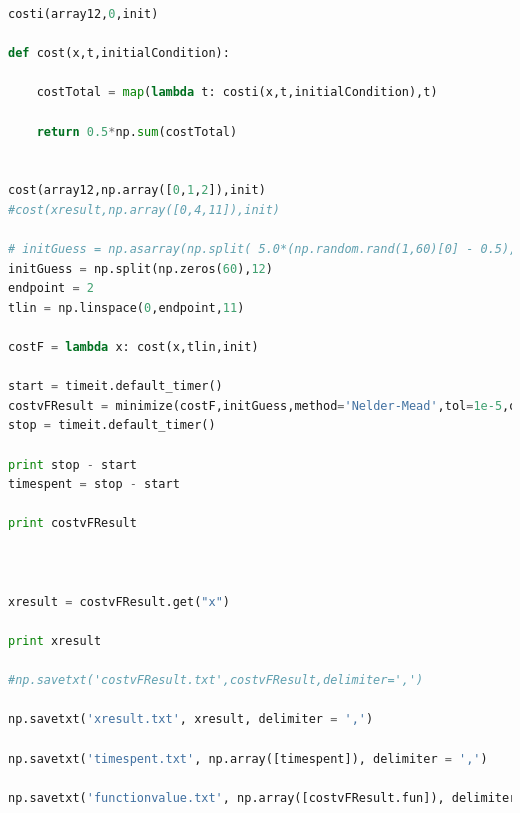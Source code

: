 \documentclass{tufte-handout}
\begin{document}
\begin{lstlisting}[language=Python]
costi(array12,0,init)

def cost(x,t,initialCondition):

    costTotal = map(lambda t: costi(x,t,initialCondition),t)

    return 0.5*np.sum(costTotal)


cost(array12,np.array([0,1,2]),init)
#cost(xresult,np.array([0,4,11]),init)

# initGuess = np.asarray(np.split( 5.0*(np.random.rand(1,60)[0] - 0.5),12))
initGuess = np.split(np.zeros(60),12)
endpoint = 2
tlin = np.linspace(0,endpoint,11)

costF = lambda x: cost(x,tlin,init)

start = timeit.default_timer()
costvFResult = minimize(costF,initGuess,method='Nelder-Mead',tol=1e-5,options={"ftol":1e-3, "maxfev": 10000000,"maxiter":10000000})
stop = timeit.default_timer()

print stop - start
timespent = stop - start

print costvFResult



xresult = costvFResult.get("x")

print xresult

#np.savetxt('costvFResult.txt',costvFResult,delimiter=',')

np.savetxt('xresult.txt', xresult, delimiter = ',')

np.savetxt('timespent.txt', np.array([timespent]), delimiter = ',')

np.savetxt('functionvalue.txt', np.array([costvFResult.fun]), delimiter=',')

\end{lstlisting}
\end{document}
